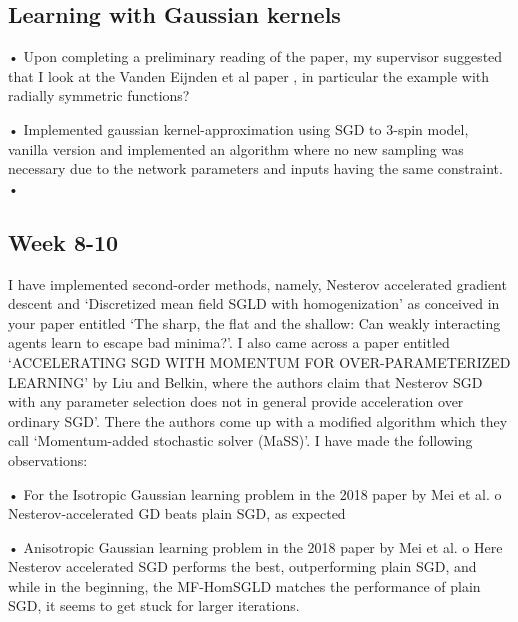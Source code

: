 \documentclass{article}
\begin{document}
\subsection{Learning with Gaussian kernels}
\label{sec:gauss}

•	 Upon completing a preliminary reading of the \cite{Mei_2018} paper, my supervisor suggested that I look at the Vanden Eijnden et al paper \cite{Rotskoff_2022}, in particular the example with radially symmetric functions? 

•	Implemented gaussian kernel-approximation using SGD to 3-spin model, vanilla version and implemented an algorithm where no new sampling was necessary due to the network parameters and inputs having the same constraint.
•	
\subsection{Week 8-10}

I have implemented second-order methods, namely, Nesterov accelerated gradient descent and ‘Discretized mean field SGLD with homogenization’ as conceived in your paper entitled ‘The sharp, the flat and the shallow: Can weakly interacting agents learn to escape bad minima?’. I also came across a paper entitled ‘ACCELERATING SGD WITH MOMENTUM FOR OVER-PARAMETERIZED LEARNING’ by Liu and Belkin, where the authors claim that Nesterov SGD with any parameter selection does not in general provide acceleration over ordinary SGD’. There the authors come up with a modified algorithm which they call ‘Momentum-added stochastic solver (MaSS)’. I have made the following observations:
 
•	For the Isotropic Gaussian learning problem in the 2018 paper by Mei et al.
o	Nesterov-accelerated GD beats plain SGD, as expected
 
 
•	Anisotropic Gaussian learning problem in the 2018 paper by Mei et al.
o	Here Nesterov accelerated SGD performs the best, outperforming plain SGD, and while in the beginning, the MF-HomSGLD matches the performance of plain SGD, it seems to get stuck for larger iterations. 
 
\end{document}
